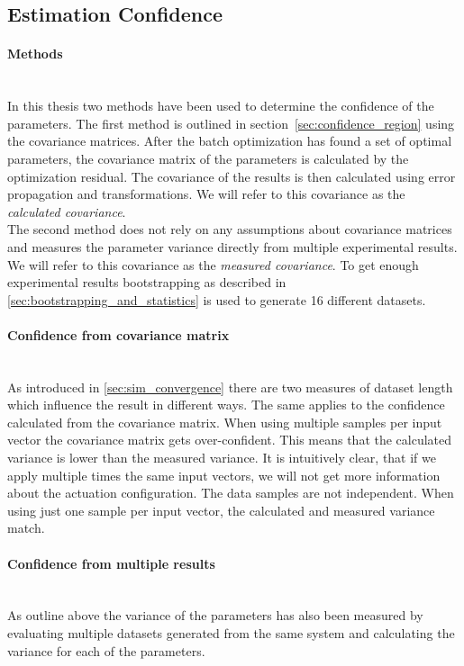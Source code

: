\subsection{Estimation Confidence}
\paragraph{Methods} ~\\
In this thesis two methods have been used to determine  the confidence of the parameters.
The first method is outlined in section~\ref{sec:confidence_region} using the covariance matrices.
After the batch optimization has found a set of optimal parameters, the covariance matrix of the parameters is calculated by the optimization residual.
The covariance of the results is then calculated using error propagation and transformations.
We will refer to this covariance as the \textit{calculated covariance}.\\
The second method does not rely on any assumptions about covariance matrices and measures the parameter variance directly from multiple experimental results.
We will refer to this covariance as the \textit{measured covariance}.
To get enough experimental results bootstrapping as described in \cref{sec:bootstrapping_and_statistics} is used to generate 16 different datasets.

\paragraph{Confidence from covariance matrix} ~\\
As introduced in \cref{sec:sim_convergence} there are two measures of dataset length which influence the result in different ways.
The same applies to the confidence calculated from the covariance matrix.
When using multiple samples per input vector the covariance matrix gets over-confident.
This means that the calculated variance is lower than the measured variance.
It is intuitively clear, that if we apply multiple times the same input vectors, we will not get more information about the actuation configuration.
The data samples are not independent.
When using just one sample per input vector, the calculated and measured variance match.

\paragraph{Confidence from multiple results} ~\\
As outline above the variance of the parameters has also been measured by evaluating multiple datasets generated from the same system and calculating the variance for each of the parameters.\\

